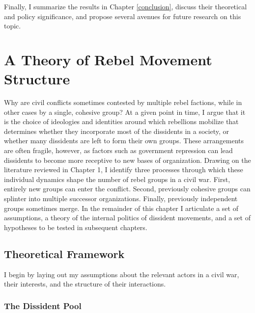 \documentclass[12pt,]{book}
\theoremstyle{definition}
\theoremstyle{definition}
\theoremstyle{definition}
\theoremstyle{remark}
\begin{document}
Finally, I summarize the results in Chapter \ref{conclusion}, discuss
their theoretical and policy significance, and propose several avenues
for future research on this topic.

\hypertarget{theory}{%
\chapter{A Theory of Rebel Movement Structure}\label{theory}}

Why are civil conflicts sometimes contested by multiple rebel factions,
while in other cases by a single, cohesive group? At a given point in
time, I argue that it is the choice of ideologies and identities around
which rebellions mobilize that determines whether they incorporate most
of the dissidents in a society, or whether many dissidents are left to
form their own groups. These arrangements are often fragile, however, as
factors such as government repression can lead dissidents to become more
receptive to new bases of organization. Drawing on the literature
reviewed in Chapter 1, I identify three processes through which these
individual dynamics shape the number of rebel groups in a civil war.
First, entirely new groups can enter the conflict. Second, previously
cohesive groups can splinter into multiple successor organizations.
Finally, previously independent groups sometimes merge. In the remainder
of this chapter I articulate a set of assumptions, a theory of the
internal politics of dissident movements, and a set of hypotheses to be
tested in subsequent chapters.

\hypertarget{theoretical-framework}{%
\section{Theoretical Framework}\label{theoretical-framework}}

I begin by laying out my assumptions about the relevant actors in a
civil war, their interests, and the structure of their interactions.

\hypertarget{the-dissident-pool}{%
\subsection{The Dissident Pool}\label{the-dissident-pool}}
\end{document}

